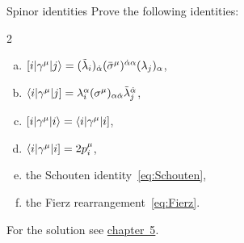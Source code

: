 \begin{exer}{Spinor identities}
\label{Ex:1.6}
Prove the following identities:
\begin{multicols}{2}
\begin{enumerate}[a)]
\item $[ i | \gamma^{\mu} | j \rangle = (\tilde{\lambda}_i)_{\dot{\alpha}} (\bar{\sigma}^{\mu})^{\dot{\alpha} \alpha} (\lambda_j)_{\alpha}$,
\item $\langle i | \gamma^{\mu} | j ] = \lambda_i^{\alpha} (\sigma^{\mu})_{\alpha\dot{\alpha}} \tilde{\lambda}_j^{\dot{\alpha}}$,
\item $[ i | \gamma^{\mu} | i \rangle = \langle i | \gamma^{\mu} | i ] $,
\item $\langle i | \gamma^{\mu} | i ] = 2 p_i^{\mu}$,
\item the Schouten identity~\eqref{eq:Schouten},
\item the Fierz rearrangement~\eqref{eq:Fierz}.
\end{enumerate}
\end{multicols}
For the solution see \hyperref[Sol:1.6]{chapter~5}.
\end{exer}



